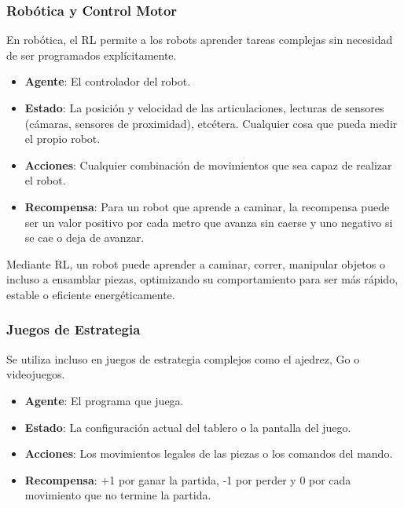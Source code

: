\documentclass[12pt,a4paper]{book}
\begin{document}
\hrulefill

\subsubsection{Robótica y Control Motor}

En robótica, el RL permite a los robots aprender tareas complejas sin necesidad de ser programados explícitamente.

\begin{itemize}
    \item \textbf{Agente}: El controlador del robot.
    \item \textbf{Estado}: La posición y velocidad de las articulaciones, lecturas de sensores (cámaras, sensores de proximidad), etcétera. Cualquier cosa que pueda medir el propio robot.
    \item \textbf{Acciones}: Cualquier combinación de movimientos que sea capaz de realizar el robot.
    \item \textbf{Recompensa}: Para un robot que aprende a caminar, la recompensa puede ser un valor positivo por cada metro que avanza sin caerse y uno negativo si se cae o deja de avanzar.
\end{itemize}

Mediante RL, un robot puede aprender a caminar, correr, manipular objetos o incluso a ensamblar piezas, optimizando su comportamiento para ser más rápido, estable o eficiente energéticamente.

\hrulefill

\subsubsection{Juegos de Estrategia}

Se utiliza incluso en juegos de estrategia complejos como el ajedrez, Go o videojuegos.

\begin{itemize}
    \item \textbf{Agente}: El programa que juega.
    \item \textbf{Estado}: La configuración actual del tablero o la pantalla del juego.
    \item \textbf{Acciones}: Los movimientos legales de las piezas o los comandos del mando.
    \item \textbf{Recompensa}: +1 por ganar la partida, -1 por perder y 0 por cada movimiento que no termine la partida.
\end{itemize}
\end{document}
